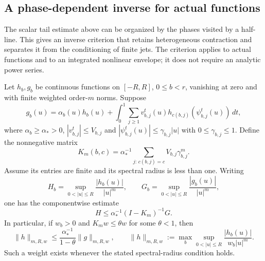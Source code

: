 \subsection{A phase-dependent inverse for actual functions}
\label{sec:v76-envelope-principle}

The scalar tail estimate above can be organized by the phases visited by
a half-line.  This gives an inverse criterion that retains heterogeneous
contraction and separates it from the conditioning of finite jets.
The criterion applies to actual functions and to an integrated nonlinear
envelope; it does not require an analytic power series.

\begin{proposition}
\label{prop:v76-envelope}
Let $h_b,g_b$ be continuous functions on $[-R,R]$, $0\le b<r$,
vanishing at zero and with finite
weighted order-$m$ norms.  Suppose
\begin{equation}\label{eq:v76-abstract-envelope}
 g_b(u)=\alpha_b(u)h_b(u)
   +\int_0^1\sum_{j\ge1}v_{b,j}^t(u)
                       h_{c(b,j)}(\psi_{b,j}^t(u))\,dt,
\end{equation}
where $\alpha_b\ge\alpha_*>0$,
$|v_{b,j}^t|\le V_{b,j}$ and
$|\psi_{b,j}^t(u)|\le\gamma_{b,j}|u|$ with
$0\le\gamma_{b,j}\le1$.  Define the nonnegative matrix
\begin{equation}\label{eq:v76-domination-matrix}
 K_m(b,c)=\alpha_*^{-1}
     \sum_{j:\,c(b,j)=c}V_{b,j}\gamma_{b,j}^m.
\end{equation}
Assume its entries are finite and its spectral radius is less than one.
Writing
\[
 H_b=\sup_{0<|u|\le R}\frac{|h_b(u)|}{|u|^m},\qquad
 G_b=\sup_{0<|u|\le R}\frac{|g_b(u)|}{|u|^m},
\]
one has the componentwise estimate
\begin{equation}\label{eq:v76-vector-inverse}
 H\le\alpha_*^{-1}(I-K_m)^{-1}G.
\end{equation}
In particular, if $w_b>0$ and $K_mw\le\theta w$ for some
$\theta<1$, then
\begin{equation}\label{eq:v76-weight-inverse}
 \|h\|_{m,R,w}\le\frac{\alpha_*^{-1}}{1-\theta}
                      \|g\|_{m,R,w},\qquad
 \|h\|_{m,R,w}:=\max_b\sup_{0<|u|\le R}
                     \frac{|h_b(u)|}{w_b|u|^m}.
\end{equation}
Such a weight exists whenever the stated spectral-radius condition holds.
\end{proposition}
